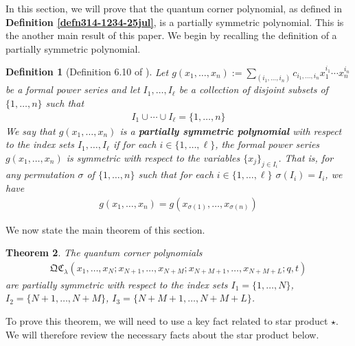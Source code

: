 \documentclass[12pt,reqno,a4paper]{amsart}
\numberwithin{equation}{section}
\newtheorem{thm}{Theorem}[section]
\newtheorem{dfn}[thm]{Definition}
\newcommand{\quantumcorner}{\mathfrak{QC}}
\theoremstyle{definition}
\begin{document}
In this section, we will prove that the quantum corner polynomial, as defined in \textbf{Definition \ref{defn314-1234-25jul}}, is a partially symmetric polynomial. This is the another main result of this paper. 
We begin by recalling the definition of a partially symmetric polynomial. 


\begin{dfn}[Definition 6.10 of \cite{CSw2024}]
Let $g(x_1,\dots,x_n) := \sum_{(i_1,\dots,i_n)}c_{i_1,\dots,i_n}x_1^{i_1}\cdots x_n^{i_n}$ be a formal power series and let $I_1,\dots,I_\ell$ be a collection of disjoint subsets of $\{1,\dots,n\}$ such that 
\begin{align}
I_1 \cup \cdots \cup I_\ell = \{1,\dots,n\}
\end{align}
We say that $g(x_1,\dots,x_n)$ is a \textbf{partially symmetric polynomial} with respect to the index sets $I_1,\dots,I_\ell$ if for each $i \in \{1,\dots,\ell\}$, the formal power series $g(x_1,\dots,x_n)$ is symmetric with respect to the variables $\{x_j\}_{j \in I_i}$. That is, for any permutation $\sigma$ of $\{1,\dots,n\}$ such that for each $i \in \{1,\dots,\ell\}$ $\sigma(I_i) = I_i$, we have 
\begin{align}
g(x_1,\dots,x_n) = g(x_{\sigma(1)},\dots,x_{\sigma(n)}) 
\end{align}
\end{dfn}

We now state the main theorem of this section. 

\begin{thm}
\label{thm42-main-1526}
The quantum corner polynomials
\begin{align}
\quantumcorner_\lambda(x_1,\dots,x_N;x_{N+1},\dots,x_{N+M};x_{N+M+1},\dots,x_{N+M+L};
q,t)
\end{align}
are partially symmetric with respect to the index sets $I_1 = \{1,\dots,N\}$, $I_2 = \{N + 1,\dots, N + M\}$, $I_3 = \{N+M+1,\dots,N+M+L\}$. 
\end{thm}

To prove this theorem, we will need to use a key fact related to star product $\star$. We will therefore review the necessary facts about the star product below. 
\end{document}
